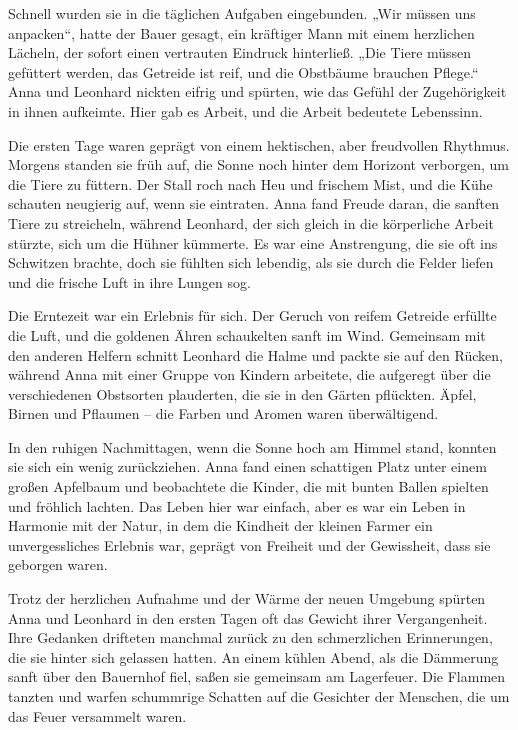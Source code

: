 \documentclass[
]{article}
\begin{document}
Schnell wurden sie in die täglichen Aufgaben eingebunden. „Wir müssen
uns anpacken``, hatte der Bauer gesagt, ein kräftiger Mann mit einem
herzlichen Lächeln, der sofort einen vertrauten Eindruck hinterließ.
„Die Tiere müssen gefüttert werden, das Getreide ist reif, und die
Obstbäume brauchen Pflege.`` Anna und Leonhard nickten eifrig und
spürten, wie das Gefühl der Zugehörigkeit in ihnen aufkeimte. Hier gab
es Arbeit, und die Arbeit bedeutete Lebenssinn.

Die ersten Tage waren geprägt von einem hektischen, aber freudvollen
Rhythmus. Morgens standen sie früh auf, die Sonne noch hinter dem
Horizont verborgen, um die Tiere zu füttern. Der Stall roch nach Heu und
frischem Mist, und die Kühe schauten neugierig auf, wenn sie eintraten.
Anna fand Freude daran, die sanften Tiere zu streicheln, während
Leonhard, der sich gleich in die körperliche Arbeit stürzte, sich um die
Hühner kümmerte. Es war eine Anstrengung, die sie oft ins Schwitzen
brachte, doch sie fühlten sich lebendig, als sie durch die Felder liefen
und die frische Luft in ihre Lungen sog.

Die Erntezeit war ein Erlebnis für sich. Der Geruch von reifem Getreide
erfüllte die Luft, und die goldenen Ähren schaukelten sanft im Wind.
Gemeinsam mit den anderen Helfern schnitt Leonhard die Halme und packte
sie auf den Rücken, während Anna mit einer Gruppe von Kindern arbeitete,
die aufgeregt über die verschiedenen Obstsorten plauderten, die sie in
den Gärten pflückten. Äpfel, Birnen und Pflaumen -- die Farben und
Aromen waren überwältigend.

In den ruhigen Nachmittagen, wenn die Sonne hoch am Himmel stand,
konnten sie sich ein wenig zurückziehen. Anna fand einen schattigen
Platz unter einem großen Apfelbaum und beobachtete die Kinder, die mit
bunten Ballen spielten und fröhlich lachten. Das Leben hier war einfach,
aber es war ein Leben in Harmonie mit der Natur, in dem die Kindheit der
kleinen Farmer ein unvergessliches Erlebnis war, geprägt von Freiheit
und der Gewissheit, dass sie geborgen waren.

Trotz der herzlichen Aufnahme und der Wärme der neuen Umgebung spürten
Anna und Leonhard in den ersten Tagen oft das Gewicht ihrer
Vergangenheit. Ihre Gedanken drifteten manchmal zurück zu den
schmerzlichen Erinnerungen, die sie hinter sich gelassen hatten. An
einem kühlen Abend, als die Dämmerung sanft über den Bauernhof fiel,
saßen sie gemeinsam am Lagerfeuer. Die Flammen tanzten und warfen
schummrige Schatten auf die Gesichter der Menschen, die um das Feuer
versammelt waren.
\end{document}
